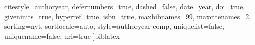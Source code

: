 	citestyle=authoryear,	%
	defernumbers=true,		%
	dashed=false,			%
	date=year,				%
	doi=true,				%
	giveninits=true,		%
	hyperref=true,			%
	isbn=true,				%
	maxbibnames=99,			%
	maxcitenames=2,			%
	sorting=nyt,			%
	sortlocale=auto,		%
	style=authoryear-comp,		%
	uniquelist=false,		%
	uniquename=false,		%
	url=true				%
]{biblatex}
\usepackage[
	autostyle=true,			%
	strict=true				%
]{csquotes}					%
\usepackage[
]{acro}						%
\usepackage{imakeidx}		%
\usepackage[
	intoc,					%
	nomentbl,				%
	noprefix,				%
]{nomencl}					%
\usepackage{listings}		%
\usepackage{xurl}			%


\usepackage[margin=2cm]{geometry}
\usepackage{algpseudocode}
\usepackage{algorithmicx}
\usepackage{algorithm}
\usepackage{animate}
\usepackage{subfig}


